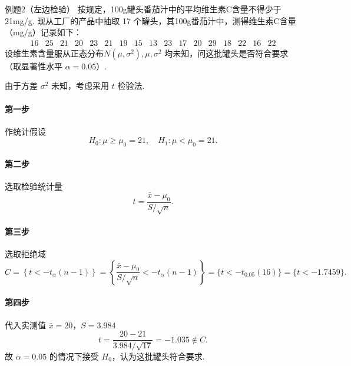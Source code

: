 \begin{question}{例题2（左边检验）}
    按规定，100g罐头番茄汁中的平均维生素C含量不得少于 21mg/g. 现从工厂的产品中抽取 17 个罐头，其100g番茄汁中，测得维生素C含量（mg/g）记录如下：
    $$
        \begin{array}{ccccccccccccccccc}
            16 & 25 & 21 & 20 & 23 & 21 & 19 & 15 & 13 & 23 & 17 & 20 & 29 & 18 & 22 & 16 & 22
        \end{array}
    $$
    设维生素含量服从正态分布$N(\mu, \sigma^2), \mu, \sigma^2$ 均未知，问这批罐头是否符合要求（取显著性水平 $\alpha=0.05$）.
\end{question}
\begin{solution}
    由于方差 $\sigma^2$ 未知，考虑采用 $t$ 检验法.
    \paragraph{第一步} 作统计假设
    $$
        H_0: \mu \geqslant \mu_0 = 21, \quad H_1: \mu < \mu_0 = 21.
    $$
    \paragraph{第二步} 选取检验统计量
    $$
        t = \frac{\bar{x}-\mu_0}{S/\sqrt{n}} .
    $$
    \paragraph{第三步} 选取拒绝域
    $$
        C = \left\{t<-t_{\alpha}(n-1)\right\}
        = \left\{\frac{\bar{x}-\mu_0}{S/\sqrt{n}}<-t_{\alpha}(n-1)\right\}
        = \{t<-t_{0.05}(16)\}
        = \{t<-1.7459\}.
    $$
    \paragraph{第四步} 代入实测值 $\bar{x}=20$，$S=3.984$
    $$
        t = \frac{20-21}{3.984/\sqrt{17}} = -1.035 \notin C.
    $$
    故 $\alpha = 0.05$ 的情况下接受 $H_0$，认为这批罐头符合要求.
\end{solution}



